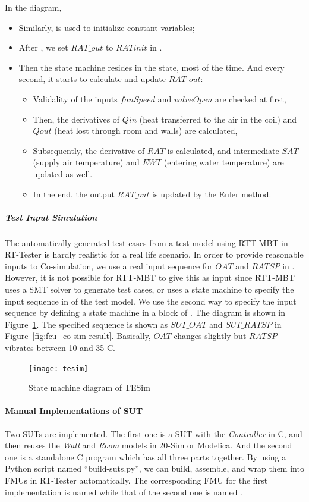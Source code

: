 In the diagram,
\begin{itemize}
    \item Similarly,  is used to initialize constant variables;
    \item After , we set $RAT\_out$ to $RATinit$ in . 
    \item Then the state machine resides in the  state, most of the time. And every second, it starts to calculate and update $RAT\_out$:
        \begin{itemize}
            \item Validality of the inputs $fanSpeed$ and $valveOpen$ are checked at first,
            \item Then, the derivatives of $Qin$ (heat transferred to the air in the coil) and $Qout$ (heat lost through room and walls) are calculated,
            \item Subsequently, the derivative of $RAT$ is calculated, and intermediate $SAT$ (supply air temperature) and $EWT$ (entering water temperature) are updated as well.
            \item In the end, the output $RAT\_out$ is updated by the Euler method.
        \end{itemize}
\end{itemize}

\subparagraph{Test Input Simulation} The automatically generated test cases from a test model using RTT-MBT in RT-Tester is hardly realistic for a real life scenario. In order to provide reasonable inputs to Co-simulation, we use a real input sequence for $OAT$ and $RATSP$ in . However, it is not possible for RTT-MBT to give this as input since RTT-MBT uses a SMT solver to generate test cases, or uses a state machine to specify the input sequence in  of the test model. 
We use the second way to specify the input sequence by defining a state machine in a block  of . The diagram is shown in Figure~\ref{fig:fcu_co_te_sim}. The specified sequence is shown as $SUT\_OAT$ and $SUT\_RATSP$ in Figure~\ref{fig:fcu_co-sim-result}. Basically, $OAT$ changes slightly but $RATSP$ vibrates between 10 and 35 \textdegree{}C.
\begin{figure}[htb!]
    \centering
	\texttt{[image: tesim]}
    \caption{State machine diagram of TESim}
    \label{fig:fcu_co_te_sim}
\end{figure}

\paragraph{Manual Implementations of SUT}
Two SUTs are implemented. The first one is a SUT with the \emph{Controller} in C, and then reuses the \emph{Wall} and \emph{Room} models in 20-Sim or Modelica. And the second one is a standalone C program which has all three parts together. By using a Python script named ``build-suts.py'', we can build, assemble, and wrap them into FMUs in RT-Tester automatically. The corresponding FMU for the first implementation is named  while that of the second one is named .

